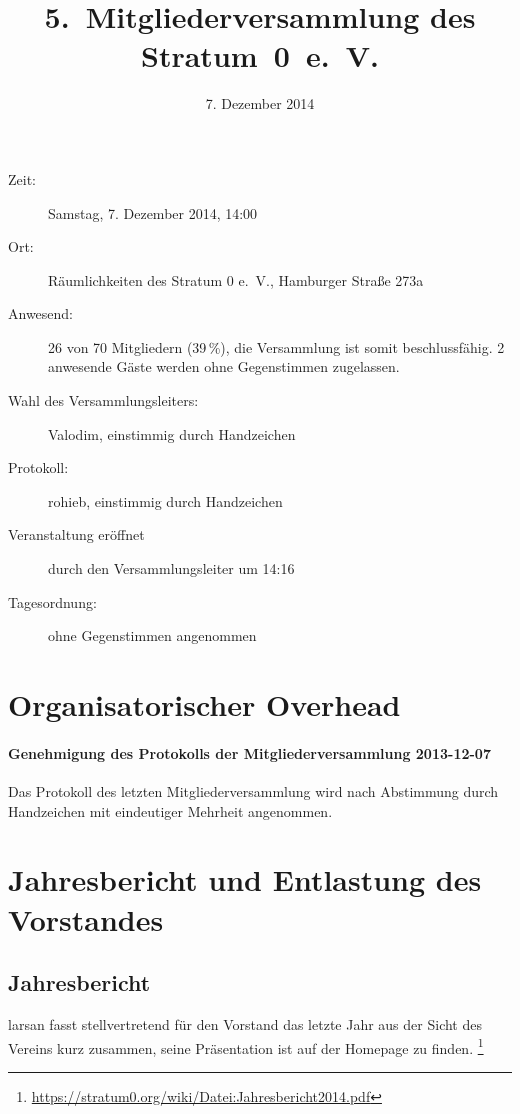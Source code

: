 \documentclass[a4paper,12pt]{scrartcl}
\title{5.~Mitgliederversammlung des Stratum~0~e.~V.}
\date{7. Dezember 2014}
\begin{document}
\maketitle

\begin{description}
  \item[Zeit:] Samstag, 7. Dezember 2014, 14:00
  \item[Ort:] Räumlichkeiten des Stratum 0 e.~V., Hamburger Straße 273a
  \item[Anwesend:] 26 von 70 Mitgliedern (39\,\%), die Versammlung
    ist somit beschlussfähig. 2 anwesende Gäste werden ohne Gegenstimmen
    zugelassen.
  \item[Wahl des Versammlungsleiters:] Valodim, einstimmig durch Handzeichen
  \item[Protokoll:] rohieb, einstimmig durch Handzeichen
  \item[Veranstaltung eröffnet] durch den Versammlungsleiter um 14:16
  \item[Tagesordnung:] ohne Gegenstimmen angenommen
\end{description}


\section{Organisatorischer Overhead}

\paragraph{Genehmigung des Protokolls der Mitgliederversammlung 2013-12-07}
Das Protokoll des letzten Mitgliederversammlung wird nach Abstimmung durch
Handzeichen mit eindeutiger Mehrheit angenommen.

\section{Jahresbericht und Entlastung des Vorstandes}
\subsection*{Jahresbericht}
larsan fasst stellvertretend für den Vorstand das letzte Jahr aus der Sicht des
Vereins kurz zusammen, seine Präsentation ist auf der Homepage zu finden.
\footnote{\url{https://stratum0.org/wiki/Datei:Jahresbericht2014.pdf}}
\end{document}
